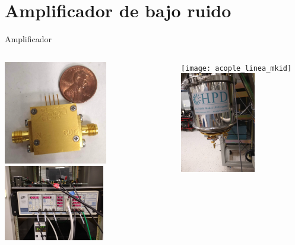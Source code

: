 \documentclass[ignorenonframetext,12pt]{beamer}
\begin{document}
\section{Amplificador de bajo ruido}
\begin{frame}{Amplificador}
				\begin{columns}
								\begin{column}{0.45\textwidth}
												\includegraphics[angle=-90,width=0.62\textwidth]{amp_low_temp1} \\ 
												\includegraphics[angle=-90,width=0.6\textwidth]{sim900_mainframe_med_temp}
								\end{column}
								\begin{column}{0.45\textwidth}
												\texttt{[image: acople\_linea\_mkid]} \\ 
												\includegraphics[angle=-90,width=0.6\textwidth]{criostato_modelo}

\end{column}
\end{columns}
\end{frame}
\end{document}
